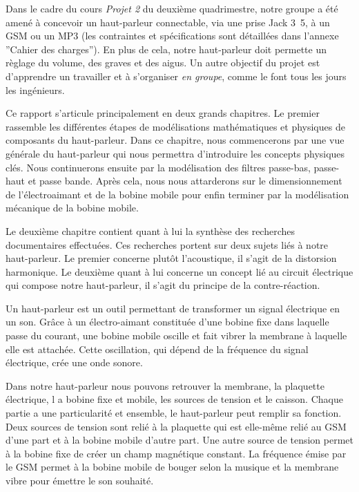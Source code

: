 

Dans le cadre du cours \textit{Projet 2} du deuxième quadrimestre, notre groupe a été amené à 
concevoir un haut-parleur connectable, via une prise Jack \unit{3.5}{\milli\meter}, à un 
GSM ou un MP3 (les contraintes et spécifications sont détaillées dans l'annexe ''Cahier des charges''). 
En plus de cela, notre haut-parleur doit permette un règlage du volume, des graves
et des aigus. Un autre objectif du projet est d'apprendre un travailler et à s'organiser \textit{en groupe}, 
comme le font tous les jours les ingénieurs.

Ce rapport s'articule principalement en deux grands chapitres. Le premier
rassemble les différentes étapes de modélisations mathématiques
et physiques de composants du haut-parleur. Dans ce chapitre, nous 
commencerons par une vue générale du haut-parleur qui nous
permettra d'introduire les concepts physiques clés. Nous continuerons
ensuite par la modélisation des filtres passe-bas, passe-haut et passe bande.
Après cela, nous nous attarderons  sur le dimensionnement de l'électroaimant et
de la bobine mobile pour enfin terminer par la modélisation mécanique de la bobine
mobile.

Le deuxième chapitre contient quant à lui la synthèse des recherches documentaires
effectuées. Ces recherches portent sur deux sujets liés à notre haut-parleur. Le premier
concerne plutôt l'acoustique, il s'agit de la 
distorsion harmonique. Le deuxième quant à lui concerne un concept lié au circuit électrique qui
compose notre haut-parleur, il s'agit du principe de la contre-réaction.

Un haut-parleur est un outil permettant de transformer un signal 
électrique en un son. Grâce à un électro-aimant constituée d'une 
bobine fixe dans laquelle passe du courant, une bobine mobile 
oscille et fait vibrer la membrane à laquelle elle est attachée. 
Cette oscillation, qui dépend de la fréquence du signal électrique, 
crée une onde sonore.

Dans notre haut-parleur nous pouvons retrouver la membrane, la plaquette électrique, l
a bobine fixe et mobile, les sources de tension et le caisson.  Chaque partie a 
une particularité et ensemble, le haut-parleur peut remplir sa fonction.  Deux sources
de tension sont relié à la plaquette qui est elle-même relié au GSM d’une part et à 
la bobine mobile d’autre part.  Une autre source de tension permet à la bobine fixe de 
créer un champ magnétique constant.  La fréquence émise par le GSM permet à la bobine 
mobile de bouger selon la musique et la membrane vibre pour émettre le son souhaité.

